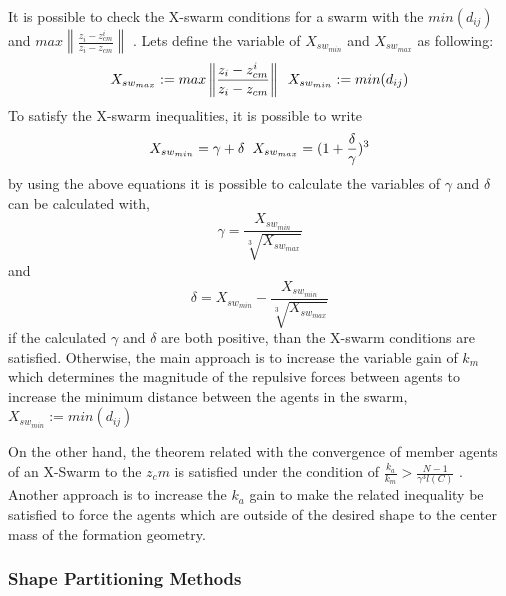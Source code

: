 \documentclass[twoside]{article}
\newcommand{\norm}[1]{\left\lVert#1\right\rVert}
\begin{document}
		It is possible to check the X-swarm conditions for a swarm  with the $min(d_{ij})$ and $max \norm{\frac{z_i - z_{cm}^i}{z_i - z_{cm}}} $ . Lets define the variable  of $X_{sw_{min}}$ and $X_{sw_{max}}$ as following:
		\begin{equation}
X_{sw_{max}} := max \norm{\frac{z_i - z_{cm}^i}{z_i - z_{cm}}}  \hspace{0.2cm} X_{sw_{min}} := min(d_{ij})
		\end{equation}
			To satisfy the X-swarm inequalities, it is possible to write 
			\begin{equation}
 X_{sw_{min}} = \gamma + \delta  \hspace{0.2cm} X_{sw_{max}} = (1 + \frac{\delta}{\gamma})^3
			\end{equation}
			by using the above equations it is possible to calculate the variables of $\gamma$ and $\delta$ can be calculated with,
			\begin{equation}
  \gamma = \frac{ X_{sw_{min}}}{\sqrt[3]{ X_{sw_{max}}}}
			\end{equation}
			and
			\begin{equation}
\delta =  X_{sw_{min}} - \frac{ X_{sw_{min}}}{\sqrt[3]{ X_{sw_{max}}}}
			\end{equation}
			if the calculated  $\gamma$ and $\delta$ are both positive, than the X-swarm conditions are satisfied. Otherwise, the main approach is to increase the variable gain of $k_m$ which determines the magnitude of the repulsive forces between agents to increase the minimum distance between the agents in the swarm, $X_{sw_{min}} := min(d_{ij})$
			
			On the other hand, the theorem related with the convergence of member agents of an X-Swarm to the $z_cm$ is satisfied under the condition of $\frac{k_a}{k_m} > \frac{N-1}{\gamma^3  l(C)}$ . Another approach is to increase the $k_a$ gain to make the related inequality be satisfied to force the agents which are outside of the desired shape to the center mass of the formation geometry. 
			
			
			
		\subsubsection{Shape Partitioning Methods}
			
\end{document}
